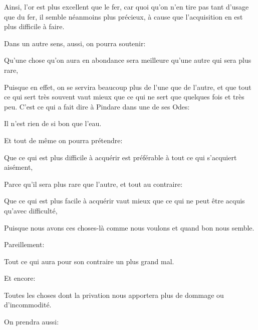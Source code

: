 Ainsi, l'or est plus excellent que le fer, car quoi qu'on n'en tire pas tant d'usage que du fer, il semble néanmoins plus
précieux, à cause que l'acquisition en est plus difficile à faire.

Dans un autre sens, aussi, on pourra soutenir:

\begin{emphpar}
	Qu'une chose qu'on aura en abondance sera meilleure qu'une autre qui sera plus rare,
\end{emphpar}

Puisque en effet, on se servira beaucoup plus de l'une que de l'autre, et que tout ce qui sert très souvent vaut mieux que
ce qui ne sert que quelques fois et très peu. C'est ce qui a fait dire à Pindare dans une de ses Odes:

\begin{emphpar}
	Il n'est rien de si bon que l'eau.
\end{emphpar}

\bigbreak

Et tout de même on pourra prétendre:

\begin{emphpar}
	Que ce qui est plus difficile à acquérir est préférable à tout ce qui s'acquiert aisément,
\end{emphpar}

Parce qu'il sera plus rare que l'autre, et tout au contraire:

\begin{emphpar}
	Que ce qui est plus facile à acquérir vaut mieux que ce qui ne peut être acquis qu'avec difficulté,
\end{emphpar}

Puisque nous avons ces choses-là comme nous voulons et quand bon nous semble.

\bigbreak

Pareillement:

\begin{emphpar}
	Tout ce qui aura pour son contraire un plus grand mal.
\end{emphpar}

\bigbreak

Et encore:

\begin{emphpar}
	Toutes les choses dont la privation nous apportera plus de dommage ou d'incommodité.
\end{emphpar}

\bigbreak

On prendra aussi:

